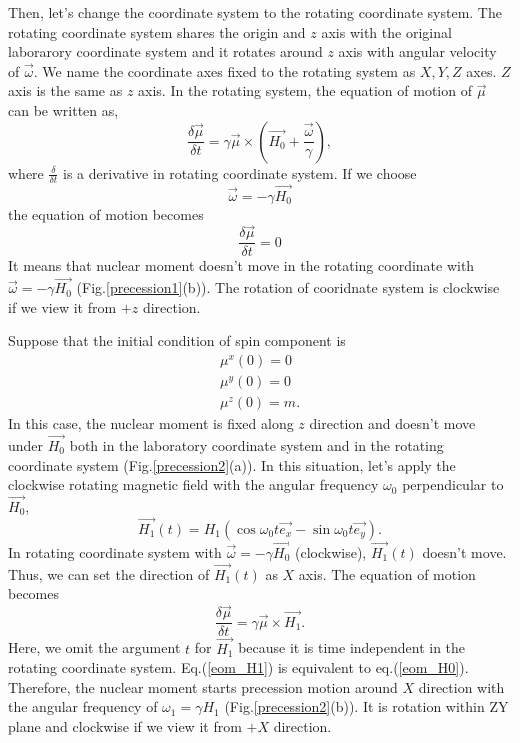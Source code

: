 \documentclass[a4,10.5pt]{report}
\begin{document}
Then, let's change the coordinate system to the rotating coordinate system.
The rotating coordinate system shares the origin and $z$ axis with the original laborarory coordinate system and it rotates 
around $z$ axis with angular velocity of $\vec{\omega}$.
We name the coordinate axes fixed to the rotating system as $X, Y, Z$ axes.
$Z$ axis is the same as $z$ axis.
In the rotating system, the equation of motion of $\vec{\mu}$ can be written as,
\begin{equation}
\frac{\delta\vec{\mu}}{\delta t} = \gamma\vec{\mu}\times\left(\overrightarrow{H_0} + \frac{\vec{\omega}}{\gamma}\right),
\end{equation}
where $\frac{\delta}{\delta t}$ is a derivative in rotating coordinate system.
If we choose 
\begin{equation}
\vec{\omega} = -\gamma\overrightarrow{H_0}
\end{equation}
the equation of motion becomes 
\begin{equation}
\frac{\delta\vec{\mu}}{\delta t} = 0
\end{equation}
It means that nuclear moment doesn't move in the rotating coordinate with $\vec{\omega} = -\gamma\overrightarrow{H_0}$ (Fig.\ref{precession1}(b)).
The rotation of cooridnate system is clockwise if we view it from $+z$ direction.

Suppose that the initial condition of spin component is 
\begin{align}
\mu^x(0) = 0\\
\mu^y(0) = 0\\
\mu^z(0) = m.
\end{align}
In this case, the nuclear moment is fixed along $z$ direction and doesn't move under $\overrightarrow{H_0}$ 
both in the laboratory coordinate system and in the rotating coordinate system (Fig.\ref{precession2}(a)).
In this situation, let's apply the clockwise rotating magnetic field with the angular frequency $\omega_0$ perpendicular to $\overrightarrow{H_0}$,
\begin{equation}
\overrightarrow{H_1}(t) = H_1(\cos\omega_0t\vec{e_x} - \sin\omega_0t\vec{e_y}).
\end{equation}
In rotating coordinate system with $\vec{\omega} = -\gamma\overrightarrow{H_0}$ (clockwise), $\overrightarrow{H_1}(t)$ doesn't move.
Thus, we can set the direction of $\overrightarrow{H_1}(t)$ as $X$ axis.
The equation of motion becomes
\begin{equation}
\frac{\delta\vec{\mu}}{\delta t} = \gamma\vec{\mu}\times\overrightarrow{H_1}.
\label{eom_H1}
\end{equation}
Here, we omit the argument $t$ for $\overrightarrow{H_1}$ because it is time independent in the rotating coordinate system.
Eq.(\ref{eom_H1}) is equivalent to eq.(\ref{eom_H0}).
Therefore, the nuclear moment starts precession motion around $X$ direction with the angular frequency of $\omega_1 = \gamma H_1$ (Fig.\ref{precession2}(b)).
It is rotation within ZY plane and clockwise if we view it from $+X$ direction.
\end{document}
